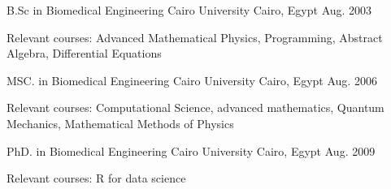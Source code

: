 \begin{cventries}
  \cventry
    {B.Sc in Biomedical Engineering}
    {Cairo University}
    {Cairo, Egypt}
    {Aug. 2003}
    {
      \begin{cvitems}
        \item {Relevant courses: Advanced Mathematical Physics, Programming, Abstract Algebra, Differential Equations}
      \end{cvitems}
    }
    \cventry
    {MSC. in Biomedical Engineering}
    {Cairo University}
    {Cairo, Egypt}
    {Aug. 2006}
    {
        \begin{cvitems}
            \item {Relevant courses: Computational Science, advanced mathematics, Quantum Mechanics, Mathematical Methods of Physics}
        \end{cvitems}
    }
    \cventry
    {PhD. in Biomedical Engineering}
    {Cairo University}
    {Cairo, Egypt}
    {Aug. 2009}
    {
        \begin{cvitems}
            \item{ Relevant courses: R for data science}
        \end{cvitems}
    }
\end{cventries}



